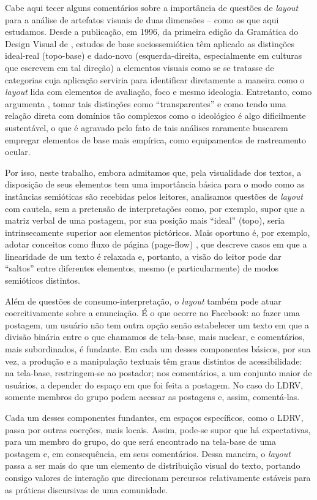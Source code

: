 \documentclass{textolivre-html}
\begin{document}
Cabe aqui tecer alguns comentários sobre a importância de questões de \textit{layout} para a análise de artefatos visuais de duas dimensões – como os que aqui estudamos. Desde a publicação, em 1996, da primeira edição da Gramática do Design Visual de \textcite{kress2006}, estudos de base sociossemiótica têm aplicado as distinções ideal-real (topo-base) e dado-novo (esquerda-direita, especialmente em culturas que escrevem em tal direção) a elementos visuais como se se tratasse de categorias cuja aplicação serviria para identificar diretamente a maneira como o \textit{layout} lida com elementos de avaliação, foco e mesmo ideologia. Entretanto, como argumenta \textcite[p. 43-50]{bateman2008}, tomar tais distinções como “transparentes” e como tendo uma relação direta com domínios tão complexos como o ideológico é algo dificilmente sustentável, o que é agravado pelo fato de tais análises raramente buscarem empregar elementos de base mais empírica, como equipamentos de rastreamento ocular.

Por isso, neste trabalho, embora admitamos que, pela visualidade dos textos, a disposição de seus elementos tem uma importância básica para o modo como as instâncias semióticas são recebidas pelos leitores, analisamos questões de \textit{layout} com cautela, sem a pretensão de interpretações como, por exemplo, supor que a matriz verbal de uma postagem, por sua posição mais “ideal” (topo), seria intrinsecamente superior aos elementos pictóricos. Mais oportuno é, por exemplo, adotar conceitos como fluxo de página (page-flow) \cite{bateman2008}, que descreve casos em que a linearidade de um texto é relaxada e, portanto, a visão do leitor pode dar “saltos” entre diferentes elementos, mesmo (e particularmente) de modos semióticos distintos.

Além de questões de consumo-interpretação, o \textit{layout} também pode atuar coercitivamente sobre a enunciação. É o que ocorre no Facebook: ao fazer uma postagem, um usuário não tem outra opção senão estabelecer um texto em que a divisão binária entre o que chamamos de tela-base, mais nuclear, e comentários, mais subordinados, é fundante. Em cada um desses componentes básicos, por sua vez, a produção e a manipulação textuais têm graus distintos de acessibilidade: na tela-base, restringem-se ao postador; nos comentários, a um conjunto maior de usuários, a depender do espaço em que foi feita a postagem. No caso do LDRV, somente membros do grupo podem acessar as postagens e, assim, comentá-las.

Cada um desses componentes fundantes, em espaços específicos, como o LDRV, passa por outras coerções, mais locais. Assim, pode-se supor que há expectativas, para um membro do grupo, do que será encontrado na tela-base de uma postagem e, em consequência, em seus comentários. Dessa maneira, o \textit{layout} passa a ser mais do que um elemento de distribuição visual do texto, portando consigo valores de interação que direcionam percursos relativamente estáveis para as práticas discursivas de uma comunidade.
\end{document}

